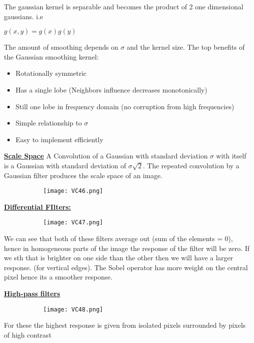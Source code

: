 \documentclass[8pt]{extreport}
\begin{document}
The gaussian kernel is separable and becomes the product of 2 one dimensional gaussians. i.e 
\begin{center}
$g(x,y) = g(x)g(y)$
\end{center}
The amount of smoothing depends on $\sigma$ and the kernel size.
The top benefits of the Gaussian smoothing kernel:
\begin{itemize}
\item Rotationally symmetric 
\item Has a single lobe (Neighbors influence decreases monotonically)
\item Still one lobe in frequency domain (no corruption from high frequencies) 
\item Simple relationship to $\sigma$
\item Easy to implement efficiently
\end{itemize}

\underline{\textbf{Scale Space}} A Convolution of a Gaussian with standard deviation $\sigma$ with itself is a Gaussian with standard deviation of $\sigma\sqrt{2}$. The repeated convolution by a Gaussian filter produces the scale space of an image. 
\begin{figure}[H]
\centering
\begin{subfigure}[b]{0.32\linewidth}
\texttt{[image: VC46.png]}
\end{subfigure}
\end{figure}

\underline{\textbf{Differential FIlters:}}
\begin{figure}[H]
\centering
\begin{subfigure}[b]{0.32\linewidth}
\texttt{[image: VC47.png]}
\end{subfigure}
\end{figure}
We can see that both of these filters average out (sum of the elements = 0), hence in homogeneous parts of the image the response of the filter will be zero. If we sth that is brighter on one side than the other then we will have a larger response. (for vertical edges). The Sobel operator has more weight on the central pixel hence its a smoother response.

\underline{\textbf{High-pass filters}}
\begin{figure}[H]
\centering
\begin{subfigure}[b]{0.32\linewidth}
\texttt{[image: VC48.png]}
\end{subfigure}
\end{figure}
For these the highest response is given from isolated pixels surrounded by pixels of high contrast
\end{document}
